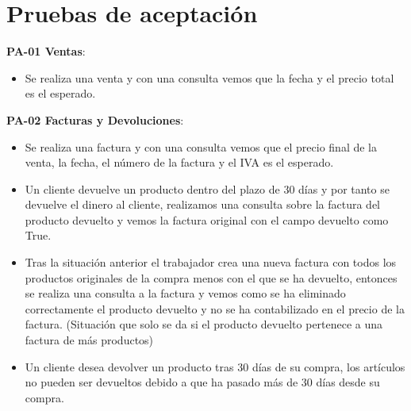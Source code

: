 




\section{Pruebas de aceptación}

\textbf{PA-01 Ventas}:
\begin{itemize}
	\item Se realiza una venta y con una consulta vemos que la fecha y el precio total es el esperado.
\end{itemize}

\textbf{PA-02 Facturas y Devoluciones}:
\begin{itemize}
	\item Se realiza una factura y con una consulta vemos que el precio final de la venta, la fecha, el número de la factura y el IVA es el esperado.
	\item Un cliente devuelve un producto dentro del plazo de 30 días y por tanto se devuelve el dinero al cliente, realizamos una consulta sobre la factura del producto devuelto y vemos la factura original con el campo devuelto como True.
	\item Tras la situación anterior el trabajador crea una nueva factura con todos los productos originales de la compra menos con el que se ha devuelto, entonces se realiza una consulta a la factura y vemos como se ha eliminado correctamente el producto devuelto y no se ha contabilizado en el precio de la factura. (Situación que solo se da si el producto devuelto pertenece a una factura de más productos)
	\item Un cliente desea devolver un producto tras 30 días de su compra, los artículos no pueden ser devueltos debido a que ha pasado más de 30 días desde su compra.
\end{itemize}


